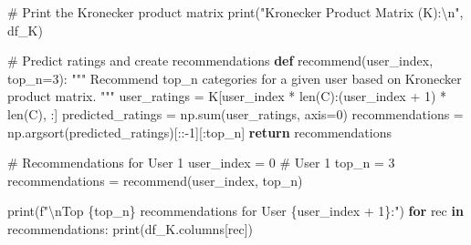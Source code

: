\documentclass[
  letterpaper,
  DIV=11,
  numbers=noendperiod]{scrreprt}
\newenvironment{Shaded}{\begin{snugshade}}{\end{snugshade}}
\newcommand{\BuiltInTok}[1]{\textcolor[rgb]{0.00,0.23,0.31}{#1}}
\newcommand{\CharTok}[1]{\textcolor[rgb]{0.13,0.47,0.30}{#1}}
\newcommand{\CommentTok}[1]{\textcolor[rgb]{0.37,0.37,0.37}{#1}}
\newcommand{\ControlFlowTok}[1]{\textcolor[rgb]{0.00,0.23,0.31}{\textbf{#1}}}
\newcommand{\DecValTok}[1]{\textcolor[rgb]{0.68,0.00,0.00}{#1}}
\newcommand{\KeywordTok}[1]{\textcolor[rgb]{0.00,0.23,0.31}{\textbf{#1}}}
\newcommand{\NormalTok}[1]{\textcolor[rgb]{0.00,0.23,0.31}{#1}}
\newcommand{\OperatorTok}[1]{\textcolor[rgb]{0.37,0.37,0.37}{#1}}
\newcommand{\SpecialCharTok}[1]{\textcolor[rgb]{0.37,0.37,0.37}{#1}}
\newcommand{\SpecialStringTok}[1]{\textcolor[rgb]{0.13,0.47,0.30}{#1}}
\newcommand{\StringTok}[1]{\textcolor[rgb]{0.13,0.47,0.30}{#1}}
\theoremstyle{plain}
\theoremstyle{definition}
\theoremstyle{remark}
\begin{document}
\begin{Shaded}
\begin{Highlighting}[]
\CommentTok{\# Print the Kronecker product matrix}
\BuiltInTok{print}\NormalTok{(}\StringTok{"Kronecker Product Matrix (K):}\CharTok{\textbackslash{}n}\StringTok{"}\NormalTok{, df\_K)}

\CommentTok{\# Predict ratings and create recommendations}
\KeywordTok{def}\NormalTok{ recommend(user\_index, top\_n}\OperatorTok{=}\DecValTok{3}\NormalTok{):}
    \CommentTok{""" Recommend top\_n categories for a given user based on Kronecker product matrix. """}
\NormalTok{    user\_ratings }\OperatorTok{=}\NormalTok{ K[user\_index }\OperatorTok{*} \BuiltInTok{len}\NormalTok{(C):(user\_index }\OperatorTok{+} \DecValTok{1}\NormalTok{) }\OperatorTok{*} \BuiltInTok{len}\NormalTok{(C), :]}
\NormalTok{    predicted\_ratings }\OperatorTok{=}\NormalTok{ np.}\BuiltInTok{sum}\NormalTok{(user\_ratings, axis}\OperatorTok{=}\DecValTok{0}\NormalTok{)}
\NormalTok{    recommendations }\OperatorTok{=}\NormalTok{ np.argsort(predicted\_ratings)[::}\OperatorTok{{-}}\DecValTok{1}\NormalTok{][:top\_n]}
    \ControlFlowTok{return}\NormalTok{ recommendations}

\CommentTok{\# Recommendations for User 1}
\NormalTok{user\_index }\OperatorTok{=} \DecValTok{0}  \CommentTok{\# User 1}
\NormalTok{top\_n }\OperatorTok{=} \DecValTok{3}
\NormalTok{recommendations }\OperatorTok{=}\NormalTok{ recommend(user\_index, top\_n)}

\BuiltInTok{print}\NormalTok{(}\SpecialStringTok{f"}\CharTok{\textbackslash{}n}\SpecialStringTok{Top }\SpecialCharTok{\{}\NormalTok{top\_n}\SpecialCharTok{\}}\SpecialStringTok{ recommendations for User }\SpecialCharTok{\{}\NormalTok{user\_index }\OperatorTok{+} \DecValTok{1}\SpecialCharTok{\}}\SpecialStringTok{:"}\NormalTok{)}
\ControlFlowTok{for}\NormalTok{ rec }\KeywordTok{in}\NormalTok{ recommendations:}
    \BuiltInTok{print}\NormalTok{(df\_K.columns[rec])}
\end{Highlighting}
\end{Shaded}
\end{document}
